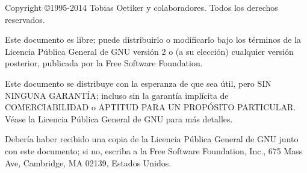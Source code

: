 
\ifx\pdfoutput\undefined %
\else
{}
\fi
\newlength{\centeroffset}
\setlength{\centeroffset}{-0.5\oddsidemargin}
\addtolength{\centeroffset}{0.5\evensidemargin}
\thispagestyle{empty}
\noindent\hspace*{\centeroffset}

\noindent\hspace*{\centeroffset}



\pagebreak
\begin{small} 
Copyright \copyright 1995-2014 Tobias Oetiker y colaboradores. Todos los derechos reservados.

Este documento es libre; puede distribuirlo o modificarlo bajo los términos de la Licencia Pública General de GNU versión 2 o (a su elección) cualquier versión posterior, publicada por la Free Software Foundation.

Este documento se distribuye con la esperanza de que sea útil, pero SIN NINGUNA GARANTÍA; incluso sin la garantía implícita de COMERCIABILIDAD o APTITUD PARA UN PROPÓSITO PARTICULAR\@.  Véase la Licencia Pública General de GNU para más detalles.

Debería haber recibido una copia de la Licencia Pública General de GNU junto con este documento; si no, escriba a la Free Software Foundation, Inc., 675 Mass Ave, Cambridge, MA 02139, Estados Unidos.
\end{small}

\endinput
